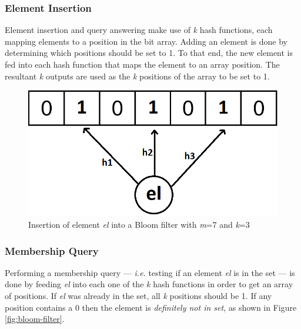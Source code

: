 \subsubsection*{Element Insertion}
Element insertion and query answering make use of \textit{k} hash functions, each mapping elements to a position in the bit array. Adding an element is done by determining which positions should be set to 1. To that end, the new element is fed into each hash function that maps the element to an array position. The resultant \textit{k} outputs are used as the \textit{k} positions of the array to be set to 1. 

\begin{figure}[!htb]
    \begin{center}
      \includegraphics[scale=0.4]{figures/insert-bloom.png}
      \caption[Bloom filter insertion]{Insertion of element \textit{el} into a Bloom filter with \textit{m}=7 and \textit{k}=3}
      \label{fig:insertion-bloom-filter}
    \end{center}
\end{figure}

\subsubsection*{Membership Query}
Performing a membership query --- \textit{i.e.} testing if an element \textit{el} is in the set --- is done by feeding \textit{el} into each one of the \textit{k} hash functions in order to get an array of positions. If \textit{el} was already in the set, all \textit{k} positions should be 1. If any position contains a 0 then the element is \textit{definitely not in set}, as shown in Figure \ref{fig:bloom-filter}. 

